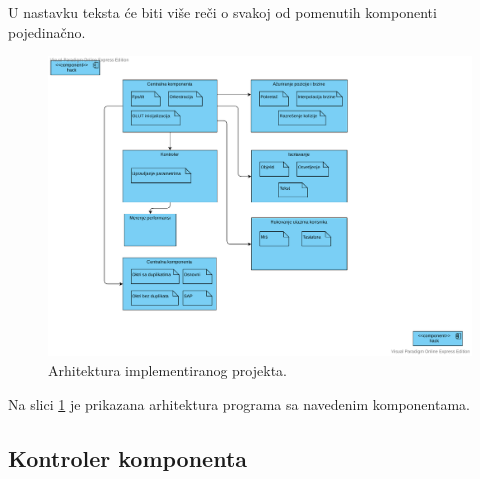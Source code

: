 \documentclass[12pt,oneside]{memoir}
\begin{document}
U nastavku teksta će biti više reči o svakoj od pomenutih komponenti pojedinačno.

\begin{figure}[h!]
	\centerfloat
	\includegraphics[trim=10 50 100 40,clip,scale=0.9]{archi2.pdf}
	\caption{Arhitektura implementiranog projekta.}
	\label{fig:archi}
\end{figure}

Na slici \ref{fig:archi} je prikazana arhitektura programa sa navedenim komponentama.

\subsection{Kontroler komponenta}
\end{document}
